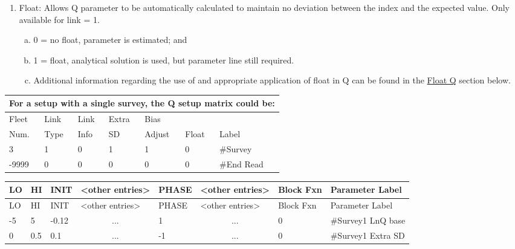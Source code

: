 \begin{enumerate}
	\item Float: Allows Q parameter to be automatically calculated to maintain no deviation between the index and the expected value. Only available for link = 1.
	\begin{enumerate}[(a)]
		\item 0 = no float, parameter is estimated; and
		\item 1 = float, analytical solution is used, but parameter line still required.
		\item Additional information regarding the use of and appropriate application of float in Q can be found in the \hyperlink{FloatQ}{Float Q} section below.
	\end{enumerate}
\end{enumerate}


\begin{longtable}{p{2cm} p{2cm} p{2cm} p{2cm} p{2cm} p{1.3cm} p{2.3cm}}
	\multicolumn{7}{l}{For a setup with a single survey, the Q setup matrix could be:} \\
	\hline
	Fleet \Tstrut & Link & Link & Extra & Bias   & & \\
	Num.          & Type & Info & SD    & Adjust & Float & Label \Bstrut\\
	\hline
	3 & 1 & 0 & 1 & 1 & 0 & \#Survey \Tstrut\\
	-9999 & 0 & 0 & 0 & 0 & 0 & \#End Read \Bstrut\\
	\hline
\end{longtable}


\begin{longtable}{p{1cm} p{1cm} p{1cm} p{1.5cm} p{1.5cm} p{1.5cm} p{1.75cm} p{4cm}}
	\hline
	LO \Tstrut & HI & INIT & <other entries> & PHASE & <other entries> & Block Fxn & Parameter Label \Bstrut\\
	\hline
	\endfirsthead

	\hline
	LO \Tstrut & HI & INIT & <other entries> & PHASE & <other entries> & Block Fxn & Parameter Label \Bstrut\\
	\hline
	\endhead

	\hline
	\endfoot
	\endlastfoot

	-5 & 5 & -0.12 & \multicolumn{1}{c}{...} &  1 & \multicolumn{1}{c}{...} & 0 & \#Survey1 LnQ base \Tstrut\\
	 0 & 0.5 & 0.1 & \multicolumn{1}{c}{...} & -1 & \multicolumn{1}{c}{...} & 0 & \#Survey1 Extra SD \Bstrut\\
	\hline
\end{longtable}

